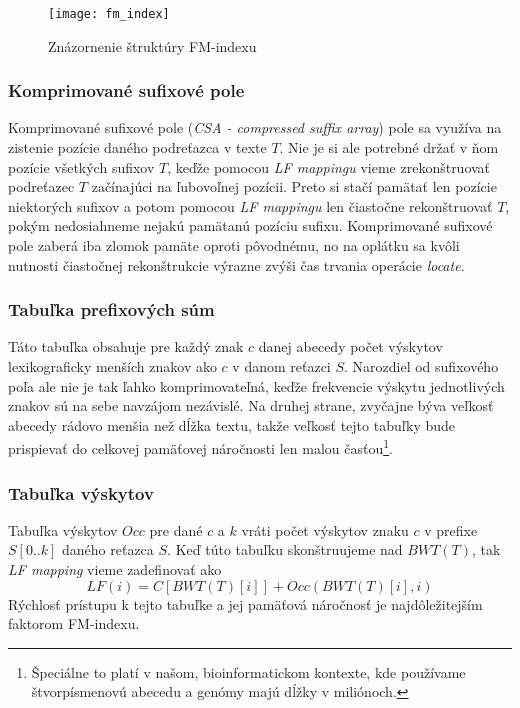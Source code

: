     \begin{figure}[h]
        \centering
        \texttt{[image: fm\_index]}
        \caption{Znázornenie štruktúry FM-indexu}
        \label{fig:fm_index}
    \end{figure}
    
    \subsubsection{Komprimované sufixové pole}
    Komprimované sufixové pole (\emph{CSA - compressed suffix array}) pole sa využíva na zistenie pozície daného podreťazca v texte $T$. Nie je si ale potrebné držať v ňom pozície všetkých sufixov $T$, keďže pomocou \emph{LF mappingu} vieme zrekonštruovať podreťazec $T$ začínajúci na ľubovoľnej pozícii. Preto si stačí pamätať len pozície niektorých sufixov a potom pomocou \emph{LF mappingu} len čiastočne rekonštruovať $T$, pokým nedosiahneme nejakú pamätanú pozíciu sufixu. Komprimované sufixové pole zaberá iba zlomok pamäte oproti pôvodnému, no na oplátku sa kvôli nutnosti čiastočnej rekonštrukcie výrazne zvýši čas trvania operácie \emph{locate}.
    
    \subsubsection{Tabuľka prefixových súm}
    Táto tabuľka obsahuje pre každý znak $c$ danej abecedy počet výskytov lexikograficky menších znakov ako $c$ v danom reťazci $S$. Narozdiel od sufixového poľa ale nie je tak ľahko komprimovateľná, keďže frekvencie výskytu jednotlivých znakov sú na sebe navzájom nezávislé. Na druhej strane, zvyčajne býva veľkosť abecedy rádovo menšia než dĺžka textu, takže veľkosť tejto tabuľky bude prispievať do celkovej pamäťovej náročnosti len malou časťou\footnote{Špeciálne to platí v našom, bioinformatickom kontexte, kde používame štvorpísmenovú abecedu a genómy majú dĺžky v miliónoch.}.
    
    \subsubsection{Tabuľka výskytov}
    Tabuľka výskytov $Occ$ pre dané $c$ a $k$ vráti počet výskytov znaku $c$ v prefixe $S[0..k]$ daného reťazca $S$. Keď túto tabuľku skonštruujeme nad $BWT(T)$, tak \emph{LF mapping} vieme zadefinovať ako $$LF(i) = C[BWT(T)[i]] + Occ(BWT(T)[i], i)$$
    Rýchlosť prístupu k tejto tabuľke a jej pamäťová náročnosť je najdôležitejším faktorom FM-indexu. 
    
